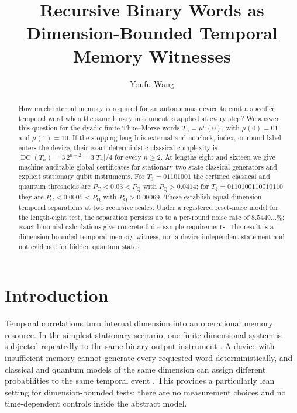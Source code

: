 \documentclass[a4paper,twocolumn,11pt,unpublished]{quantumarticle}
\newcommand{\DC}{\operatorname{DC}}
\begin{document}
\title{Recursive Binary Words as Dimension-Bounded Temporal Memory Witnesses}

\author{Youfu Wang}

\maketitle

\begin{abstract}
How much internal memory is required for an autonomous device to emit a
specified temporal word when the same binary instrument is applied at every
step?  We answer this question for the dyadic finite Thue--Morse words
$T_n=\mu^n(0)$, with $\mu(0)=01$ and $\mu(1)=10$.  If the stopping length is
external and no clock, index, or round label enters the device, their exact
deterministic classical complexity is
$\DC(T_n)=3\,2^{n-2}=3|T_n|/4$ for every $n\geq2$.  At lengths eight and
sixteen we give machine-auditable global certificates for stationary
two-state classical generators and explicit stationary qubit instruments.
For $T_3=01101001$ the certified classical and quantum thresholds are
$P_{\mathrm C}<0.03<P_{\mathrm Q}$ with $P_{\mathrm Q}>0.0414$; for
$T_4=0110100110010110$ they are
$P_{\mathrm C}<0.0005<P_{\mathrm Q}$ with $P_{\mathrm Q}>0.00069$.
These establish equal-dimension temporal separations at two recursive
scales.  Under a registered reset-noise model for the length-eight test,
the separation persists up to a per-round noise rate of
$8.5449\ldots\%$; exact binomial calculations give concrete finite-sample
requirements.  The result is a dimension-bounded temporal-memory witness,
not a device-independent statement and not evidence for hidden quantum
states.
\end{abstract}

\section{Introduction}

Temporal correlations turn internal dimension into an operational memory
resource.  In the simplest stationary scenario, one finite-dimensional
system is subjected repeatedly to the same binary-output instrument
\cite{VieiraBudroni2022}.  A device with insufficient memory cannot generate
every requested word deterministically, and classical and quantum models of
the same dimension can assign different probabilities to the same temporal
event \cite{Brierley2015,Budroni2019}.  This provides a particularly lean
setting for dimension-bounded tests: there are no measurement choices and no
time-dependent controls inside the abstract model.
\end{document}
